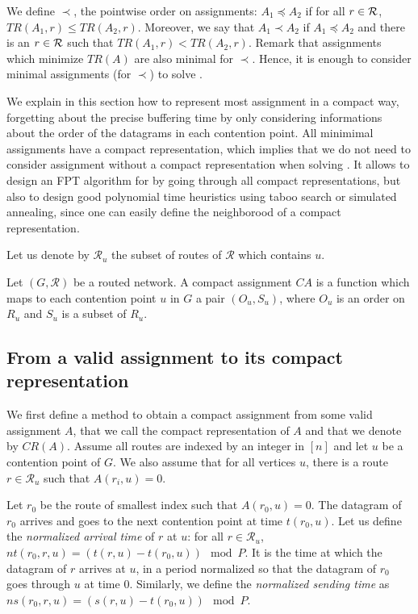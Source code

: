 \documentclass[english]{article}
\begin{document}
 We define $\prec$, the pointwise order on assignments: $A_1 \preceq A_2$ if for all $r\in \cal{R}$, $TR(A_1,r) \leq TR(A_2,r)$. Moreover, we say that $A_1 \prec A_2$ if $A_1 \preceq A_2$ and there is an $r \in \cal {R}$ such that  $TR(A_1,r) < TR(A_2,r)$. Remark that assignments which minimize $TR(A)$ are also minimal for $\prec$. Hence, it is enough to consider minimal assignments (for $\prec$) to solve \spall.

We explain in this section how to represent most assignment in a compact way, forgetting about the precise buffering time by only considering informations about the order of the datagrams in each contention point. All minimimal assignments have a compact representation, which implies that we do not need to consider assignment without a compact representation when solving \spall. 
It allows to design an FPT algorithm for \spall by going through all compact representations, but also to design good polynomial time heuristics using taboo search or simulated annealing, since one can easily define the neighborood of a compact representation.

Let us denote by $\mathcal{R}_u$ the subset of routes of $\mathcal{R}$ which contains $u$.


\begin{definition}
Let $(G, \mathcal{R})$ be a routed network. A compact assignment $CA$ is a function which maps to each contention point $u$ in $G$ a pair $(O_u,S_u)$, where $O_u$ is an order on $R_u$ and $S_u$ is a subset of $R_u$.
\label{definition:compact}
\end{definition}


\subsection{From a valid assignment to its compact representation}

We first define a method to obtain a compact assignment from some valid assignment $A$, that we call the compact representation of $A$ and that we denote by $CR(A)$. Assume all routes are indexed by an integer in $[n]$ and let $u$ be a contention point of $G$. We also assume that for all vertices $u$, there is a route $r \in \mathcal{R}_u$ such that $A(r_i,u) = 0$.

Let $r_0$ be the route of smallest index such that $A(r_0,u) = 0$. The datagram of $r_0$ arrives and goes to the next contention point at time $t(r_0,u)$. Let us define the \emph{normalized arrival time} of $r$ at $u$: for all $r \in \mathcal{R}_u$, $nt(r_0,r,u) = (t(r,u) - t(r_0,u)) \mod P$. It is the time at which the datagram of $r$ arrives at $u$, in a period normalized so that the datagram of $r_0$ goes through $u$ at time $0$. Similarly, we define the \emph{normalized sending time} as $ns(r_0,r,u) = (s(r,u) - t(r_0,u)) \mod P$.
\end{document}
